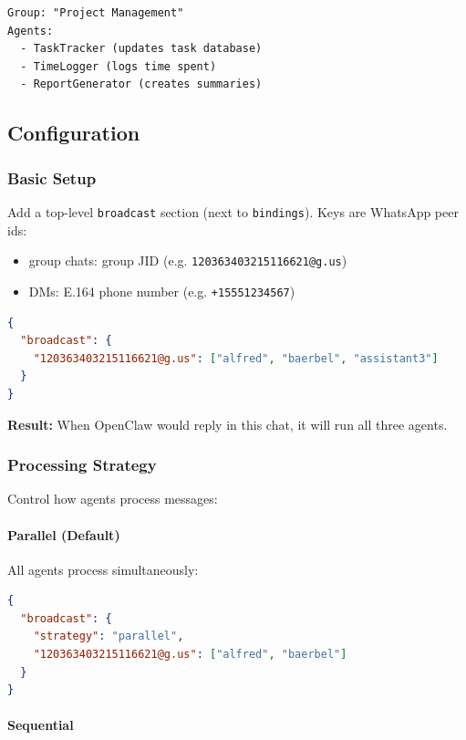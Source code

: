 \begin{lstlisting}
Group: "Project Management"
Agents:
  - TaskTracker (updates task database)
  - TimeLogger (logs time spent)
  - ReportGenerator (creates summaries)
\end{lstlisting}


\subsection{Configuration}


\subsubsection{Basic Setup}


Add a top-level \texttt{broadcast} section (next to \texttt{bindings}). Keys are WhatsApp peer ids:

\begin{itemize}
  \item group chats: group JID (e.g. \texttt{120363403215116621@g.us})
  \item DMs: E.164 phone number (e.g. \texttt{+15551234567})
\end{itemize}


\begin{lstlisting}[language=json]
{
  "broadcast": {
    "120363403215116621@g.us": ["alfred", "baerbel", "assistant3"]
  }
}
\end{lstlisting}


\textbf{Result:} When OpenClaw would reply in this chat, it will run all three agents.

\subsubsection{Processing Strategy}


Control how agents process messages:

\paragraph{Parallel (Default)}


All agents process simultaneously:

\begin{lstlisting}[language=json]
{
  "broadcast": {
    "strategy": "parallel",
    "120363403215116621@g.us": ["alfred", "baerbel"]
  }
}
\end{lstlisting}


\paragraph{Sequential}



